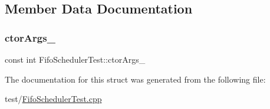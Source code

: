 \subsection{Member Data Documentation}
\mbox{\label{struct_fifo_scheduler_test_a0b3c57e6e0a5139706958649c8e70431}} 
\subsubsection{\texorpdfstring{ctor\+Args\+\_\+}{ctorArgs\_}}
{\footnotesize\ttfamily const int Fifo\+Scheduler\+Test\+::ctor\+Args\+\_\+\hspace{0.3cm}{\ttfamily [private]}}



The documentation for this struct was generated from the following file\+:\begin{DoxyCompactItemize}
\item 
test/\mbox{\hyperlink{_fifo_scheduler_test_8cpp}{Fifo\+Scheduler\+Test.\+cpp}}\end{DoxyCompactItemize}
